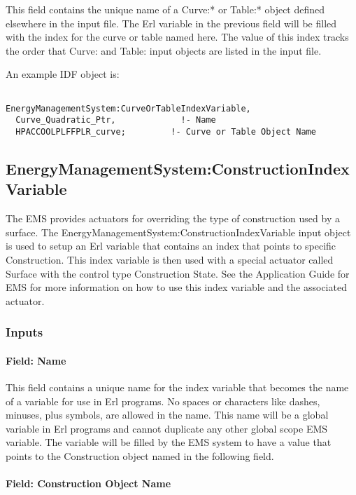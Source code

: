 This field contains the unique name of a Curve:* or Table:* object defined elsewhere in the input file. The Erl variable in the previous field will be filled with the index for the curve or table named here. The value of this index tracks the order that Curve: and Table: input objects are listed in the input file.

An example IDF object is:

\begin{lstlisting}

EnergyManagementSystem:CurveOrTableIndexVariable,
  Curve_Quadratic_Ptr,             !- Name
  HPACCOOLPLFFPLR_curve;         !- Curve or Table Object Name
\end{lstlisting}

\subsection{EnergyManagementSystem:ConstructionIndexVariable}\label{energymanagementsystemconstructionindexvariable}

The EMS provides actuators for overriding the type of construction used by a surface. The EnergyManagementSystem:ConstructionIndexVariable input object is used to setup an Erl variable that contains an index that points to specific Construction. This index variable is then used with a special actuator called Surface with the control type Construction State. See the Application Guide for EMS for more information on how to use this index variable and the associated actuator.

\subsubsection{Inputs}\label{inputs-10-004}

\paragraph{Field: Name}\label{field-name-10-004}

This field contains a unique name for the index variable that becomes the name of a variable for use in Erl programs. No spaces or characters like dashes, minuses, plus symbols, are allowed in the name. This name will be a global variable in Erl programs and cannot duplicate any other global scope EMS variable. The variable will be filled by the EMS system to have a value that points to the Construction object named in the following field.

\paragraph{Field: Construction Object Name}\label{field-construction-object-name}

